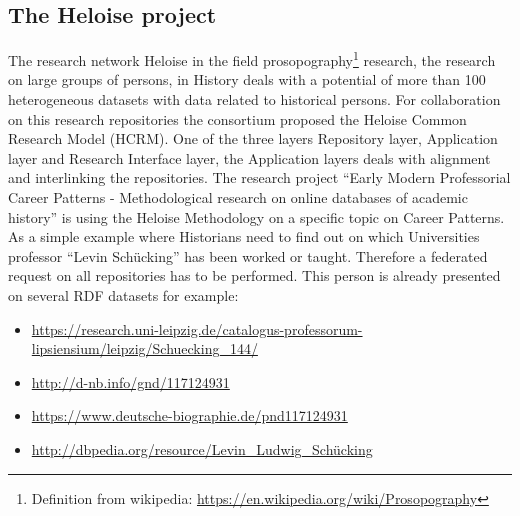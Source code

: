 
\subsection{The Heloise project} 
The research network Heloise\cite{thomasriechert2016collaborative} in the field prosopography\footnote{Definition from wikipedia: \url{https://en.wikipedia.org/wiki/Prosopography}} research, the research on large groups of persons, in History deals with a potential of more than 100 heterogeneous datasets with data related to historical persons. For collaboration on this research repositories the consortium proposed the Heloise Common Research Model (HCRM). One of the three layers Repository layer, Application layer and Research Interface layer, the Application layers deals with alignment and interlinking the repositories.   
The research project “Early Modern Professorial Career Patterns - Methodological research on online databases of academic history” is using the Heloise Methodology on a specific topic on Career Patterns.
As a simple example where Historians need to find out on which Universities professor “Levin Schücking” has been worked or taught. Therefore a federated request on all repositories has to be performed. This person is already presented on several RDF datasets for example:
\begin{itemize}
 \item \url{https://research.uni-leipzig.de/catalogus-professorum-lipsiensium/leipzig/Schuecking_144/}
 \item \url{http://d-nb.info/gnd/117124931}
 \item \url{https://www.deutsche-biographie.de/pnd117124931}
 \item \url{http://dbpedia.org/resource/Levin_Ludwig_Schücking}
\end{itemize}

